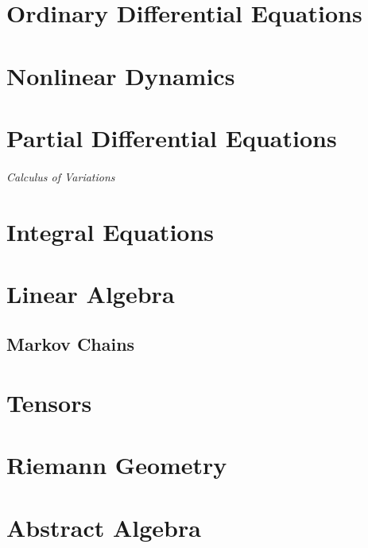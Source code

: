 \documentclass[12pt, english]{book}
\begin{document}
	
	
	
	\part{Ordinary Differential Equations} \label{Ordinary Differential Equations Part}
	
	\part{Nonlinear Dynamics} \label{Nonlinear Dynamics Part}
	
	
	\part{Partial Differential Equations} \label{Partial Differential Equations Part}
	
	\paragraph{Calculus of Variations} \label{Calculus of Variations Part}
	
	\part{Integral Equations} \label{Integral Equations Part}
	
	
	\part{Linear Algebra} \label{Linear Algebra Part}
	
	\chapter{Markov Chains} \label{Markov Chains Chapter - Linear Algebra}
	
	
	\part{Tensors} \label{Tensors Part}
	
	
	\part{Riemann Geometry} \label{Reimann Geometry Part}
	
	
	\part{Abstract Algebra} \label{Abstract Algebra Part}
	
\end{document}
